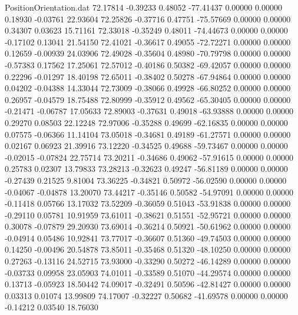 \begin{filecontents}{PositionOrientation.dat}
  72.17814   -0.39233    0.48052   -77.41437    0.00000    0.00000    0.18930   -0.03761   22.93604
  72.25826   -0.37716    0.47751   -75.57669    0.00000    0.00000    0.34307    0.03623   15.71161
  72.33018   -0.35249    0.48011   -74.44673    0.00000    0.00000   -0.17102    0.13041   21.54150
  72.41021   -0.36617    0.49055   -72.72271    0.00000    0.00000    0.12659   -0.00939   24.03906
  72.49028   -0.35604    0.48980   -70.79798    0.00000    0.00000   -0.57383    0.17562   17.25061
  72.57012   -0.40186    0.50382   -69.42057    0.00000    0.00000    0.22296   -0.01297   18.40198
  72.65011   -0.38402    0.50278   -67.94864    0.00000    0.00000    0.04202   -0.04388   14.33044
  72.73009   -0.38066    0.49928   -66.80252    0.00000    0.00000    0.26957   -0.04579   18.75488
  72.80999   -0.35912    0.49562   -65.30405    0.00000    0.00000   -0.21471   -0.06787   17.05633
  72.89003   -0.37631    0.49018   -63.93888    0.00000    0.00000    0.29270    0.08503   22.12248
  72.97006   -0.35288    0.49699   -62.16835    0.00000    0.00000    0.07575   -0.06366   11.14104
  73.05018   -0.34681    0.49189   -61.27571    0.00000    0.00000    0.02167    0.06923   21.39916
  73.12220   -0.34525    0.49688   -59.73467    0.00000    0.00000   -0.02015   -0.07824   22.75714
  73.20211   -0.34686    0.49062   -57.91615    0.00000    0.00000    0.25783    0.02307   13.79833
  73.28213   -0.32623    0.49247   -56.81189    0.00000    0.00000   -0.27439    0.21525    9.81004
  73.36225   -0.34821    0.50972   -56.02590    0.00000    0.00000   -0.04067   -0.04878   13.20070
  73.44217   -0.35146    0.50582   -54.97091    0.00000    0.00000   -0.11418    0.05766   13.17032
  73.52209   -0.36059    0.51043   -53.91838    0.00000    0.00000   -0.29110    0.05781   10.91959
  73.61011   -0.38621    0.51551   -52.95721    0.00000    0.00000    0.30078   -0.07879   29.20930
  73.69014   -0.36214    0.50921   -50.61962    0.00000    0.00000   -0.04914    0.05486   10.92841
  73.77017   -0.36607    0.51360   -49.74503    0.00000    0.00000    0.14250   -0.00496   20.54878
  73.85011   -0.35468    0.51320   -48.10250    0.00000    0.00000    0.27263   -0.13116   24.52715
  73.93000   -0.33290    0.50272   -46.14289    0.00000    0.00000   -0.03733    0.09958   23.05903
  74.01011   -0.33589    0.51070   -44.29574    0.00000    0.00000    0.13713   -0.05923   18.50442
  74.09017   -0.32491    0.50596   -42.81427    0.00000    0.00000    0.03313    0.01074   13.99809
  74.17007   -0.32227    0.50682   -41.69578    0.00000    0.00000   -0.14212    0.03540   18.76030

\end{filecontents}
